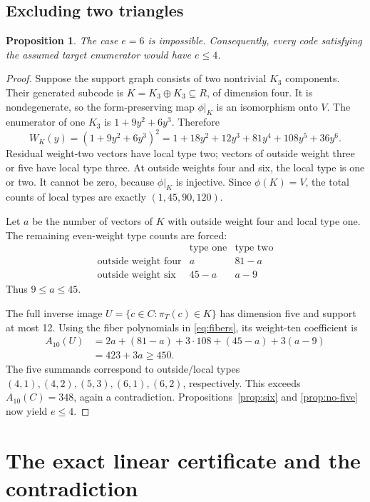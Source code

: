 \documentclass[11pt]{article}
\newtheorem{proposition}[theorem]{Proposition}
\theoremstyle{remark}
\begin{document}
\subsection{Excluding two triangles}

\begin{proposition}\label{prop:no-six}
The case $e=6$ is impossible.  Consequently, every code satisfying
the assumed target enumerator would have $e\leq4$.
\end{proposition}

\begin{proof}
Suppose the support graph consists of two nontrivial $K_3$ components.
Their generated subcode is
$K=K_3\oplus K_3\subseteq R$, of dimension four.  It is nondegenerate,
so the form-preserving map $\phi|_K$ is an isomorphism onto $V$.
The enumerator of one $K_3$ is $1+9y^2+6y^3$.  Therefore
\[
 W_K(y)=(1+9y^2+6y^3)^2
 =1+18y^2+12y^3+81y^4+108y^5+36y^6.
\]
Residual weight-two vectors have local type two; vectors of outside
weight three or five have local type three.  At outside weights four
and six, the local type is one or two.  It cannot be zero, because
$\phi|_K$ is injective.  Since $\phi(K)=V$, the total counts of local
types are exactly $(1,45,90,120)$.

Let $a$ be the number of vectors of $K$ with outside weight four and
local type one.  The remaining even-weight type counts are forced:
\[
\begin{array}{c|cc}
 &\text{type one}&\text{type two}\\\hline
 \text{outside weight four}&a&81-a\\
 \text{outside weight six}&45-a&a-9
\end{array}
\]
Thus $9\leq a\leq45$.

The full inverse image $U=\{c\in C:\pi_T(c)\in K\}$ has dimension
five and support at most 12.  Using the fiber polynomials in
\eqref{eq:fibers}, its weight-ten coefficient is
\begin{align*}
 A_{10}(U)
 &=2a+(81-a)+3\cdot108+(45-a)+3(a-9)\\
 &=423+3a\geq450.
\end{align*}
The five summands correspond to outside/local types
$(4,1),(4,2),(5,3),(6,1),(6,2)$, respectively.
This exceeds $A_{10}(C)=348$, again a contradiction.
Propositions~\ref{prop:six} and \ref{prop:no-five} now yield $e\leq4$.
\end{proof}

\section{The exact linear certificate and the contradiction}
\end{document}
